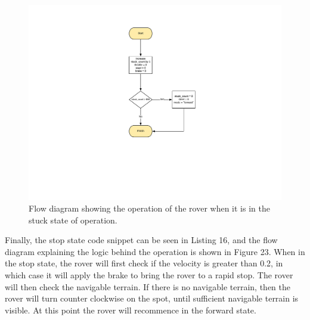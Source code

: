 \documentclass[a4paper]{article}
\begin{document}
\begin{figure}[h]
\hspace{-1.5cm}
\includegraphics[scale=0.7]{stuck_flow}
\vspace{-3cm}
\caption{Flow diagram showing the operation of the rover when it is in the stuck state of operation.}
\end{figure}

\clearpage


Finally, the stop state code snippet can be seen in Listing 16, and the flow diagram explaining the logic behind the operation is shown in Figure 23. When in the stop state, the rover will first check if the velocity is greater than 0.2, in which case it will apply the brake to bring the rover to a rapid stop. The rover will then check the navigable terrain. If there is no navigable terrain, then the rover will turn counter clockwise on the spot, until sufficient navigable terrain is visible. At this point the rover will recommence in the forward state.
\end{document}
